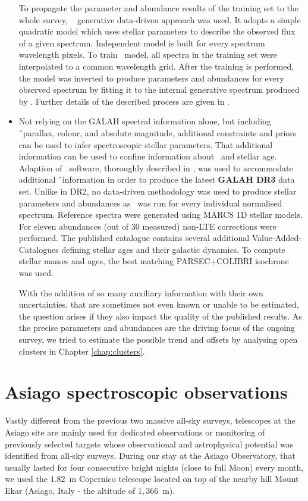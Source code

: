 \begin{itemize}
	To propagate the parameter and abundance results of the training set to the whole survey, \TC\ \cite{2015ApJ...808...16N} generative data-driven approach was used. It adopts a simple quadratic model which uses stellar parameters to describe the observed flux of a given spectrum. Independent model is built for every spectrum wavelength pixels. To train \TC\ model, all spectra in the training set were interpolated to a common wavelength grid. After the training is performed, the model was inverted to produce parameters and abundances for every observed spectrum by fitting it to the internal generative spectrum produced by \TC. Further details of the described process are given in \citet{buder2018}.
	
	\item Not relying on the GALAH spectral information alone, but including \G\ parallax, colour, and absolute magnitude, additional constraints and priors can be used to infer spectroscopic stellar parameters. That additional information can be used to confine information about \Logg\ and stellar age. Adaption of \SM\ software, thoroughly described in \citet{buder2020}, was used to accommodate additional \G\ information in order to produce the latest \textbf{GALAH DR3} data set. Unlike in DR2, no data-driven methodology was used to produce stellar parameters and abundances as \SM\ was run for every individual normalised spectrum. Reference spectra were generated using MARCS 1D stellar models. For eleven abundances (out of 30 measured) non-LTE corrections were performed. The published catalogue contains several additional Value-Added-Catalogues defining stellar ages and their galactic dynamics. To compute stellar masses and ages, the best matching PARSEC+COLIBRI isochrone was used.
	
	With the addition of so many auxiliary information with their own uncertainties, that are sometimes not even known or unable to be estimated, the question arises if they also impact the quality of the published results. As the precise parameters and abundances are the driving focus of the ongoing survey, we tried to estimate the possible trend and offsets by analysing open clusters in Chapter \ref{chap:clusters}.
	
\end{itemize}

\section{Asiago spectroscopic observations}
\label{sec:asiago_data}
Vastly different from the previous two massive all-sky surveys, telescopes at the Asiago site are mainly used for dedicated observations or monitoring of previously selected targets whose observational and astrophysical potential was identified from all-sky surveys. During our stay at the Asiago Observatory, that usually lasted for four consecutive bright nights (close to full Moon) every month, we used the $1.82$~m Copernico telescope located on top of the nearby hill Mount Ekar (Asiago, Italy - the altitude of $1,366$~m).

